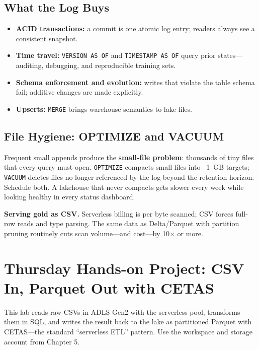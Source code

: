 \subsection{What the Log Buys}
\begin{itemize}
    \item \textbf{ACID transactions:} a commit is one atomic log entry; readers always see a consistent snapshot.
    \item \textbf{Time travel:} \texttt{VERSION AS OF} and \texttt{TIMESTAMP AS OF} query prior states---auditing, debugging, and reproducible training sets.
    \item \textbf{Schema enforcement and evolution:} writes that violate the table schema fail; additive changes are made explicitly.
    \item \textbf{Upserts:} \texttt{MERGE} brings warehouse semantics to lake files.
\end{itemize}

\subsection{File Hygiene: OPTIMIZE and VACUUM}
Frequent small appends produce the \textbf{small-file problem}: thousands of tiny files that every query must open. \texttt{OPTIMIZE} compacts small files into ~1~GB targets; \texttt{VACUUM} deletes files no longer referenced by the log beyond the retention horizon. Schedule both. A lakehouse that never compacts gets slower every week while looking healthy in every status dashboard.

\begin{pitfall}
\textbf{Serving gold as CSV.} Serverless billing is per byte scanned; CSV forces full-row reads and type parsing. The same data as Delta/Parquet with partition pruning routinely cuts scan volume---and cost---by 10$\times$ or more.
\end{pitfall}

\section{Thursday Hands-on Project: CSV In, Parquet Out with CETAS}
This lab reads raw CSVs in ADLS Gen2 with the serverless pool, transforms them in SQL, and writes the result back to the lake as partitioned Parquet with CETAS---the standard ``serverless ETL'' pattern. Use the workspace and storage account from Chapter 5.

